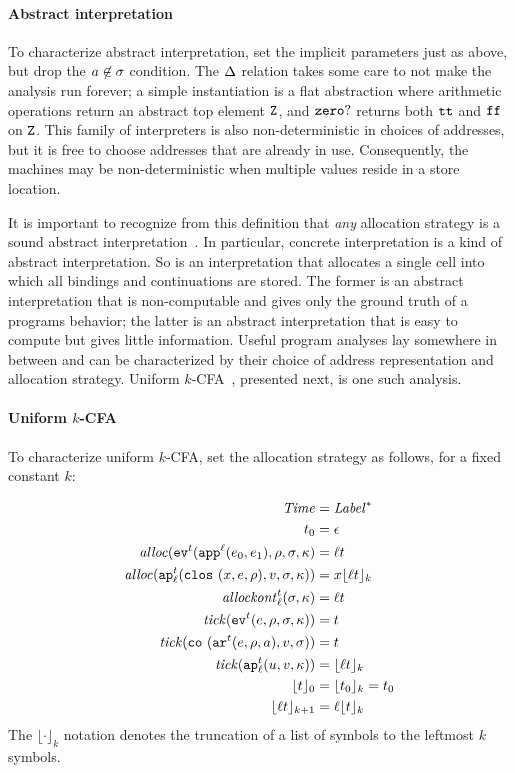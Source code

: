 \documentclass[preprint,onecolumn,9pt]{sigplanconf} %
\begin{document}
\paragraph{Abstract interpretation} To characterize abstract
interpretation, set the implicit parameters just as above, but drop
the $\maddr \not\in \msto$ condition. The $\interpdelta$ relation takes some care
to not make the analysis run forever; a simple instantiation is a flat
abstraction where arithmetic operations return an abstract top element
$\sNum$, and $\szerohuh$ returns both $\strue$ and $\sfalse$ on
$\sNum$.  This family of interpreters is also non-deterministic in
choices of addresses, but it is free to choose addresses that are
already in use.  Consequently, the machines may be non-deterministic
when multiple values reside in a store location.

It is important to recognize from this definition that \emph{any}
allocation strategy is a sound abstract
interpretation~\cite{dvanhorn:Might2009Posteriori}.  In particular,
concrete interpretation is a kind of abstract interpretation.  So is
an interpretation that allocates a single cell into which all bindings
and continuations are stored.  The former is an abstract
interpretation that is non-computable and gives only the ground truth
of a programs behavior; the latter is an abstract interpretation
that is easy to compute but gives little information.  Useful program
analyses lay somewhere in between and can be characterized by their
choice of address representation and allocation strategy.  Uniform
\(k\)-CFA~\cite{dvanhorn:nielson-nielson-popl97}, presented next, is one such analysis.

\paragraph{Uniform \(k\)-CFA} To characterize uniform \(k\)-CFA, set the allocation
strategy as follows, for a fixed constant \(k\):

\begin{align*}
\Counter &= \Label^* \\
\mtcntr &= \epsilon \\
\alloc(\ev[^\mcntr]{\sapp[^\mlab]{\mexpi0}{\mexpi1},\menv,\msto,\mkont} &= \mlab\mcntr \\
\alloc(\ap[^\mcntr_\mlab]{\clos{\mvar,\mexp,\menv},\mval,\msto,\mkont}) &= \mvar\kpush[_k]{\mlab\mcntr} \\
\allockont^\mcntr_\mlab(\msto,\mkont) &= \mlab\mcntr \\
\tick(\ev[^\mcntr]{\mexp,\menv,\msto,\mkont}) &= \mcntr \\
\tick(\co{\kar[^\mcntr]{\mexp,\menv,\maddr},\mval,\msto}) &= \mcntr \\
\tick(\ap[^\mcntr_\mlab]{\mvalx{u},\mval,\mkont}) &= \kpush[_k]{\mlab\mcntr} \\
  \kpush[_0]{\mcntr} &= \kpush[_k]{\mtcntr} = \mtcntr \\
  \kpush[_{k+1}]{\mlab\mcntr} &= \mlab\kpush[_k]{\mcntr} \\
\end{align*}
The \(\lfloor\cdot\rfloor_k\) notation denotes the truncation of a list
of symbols to the leftmost \(k\) symbols.
\end{document}
